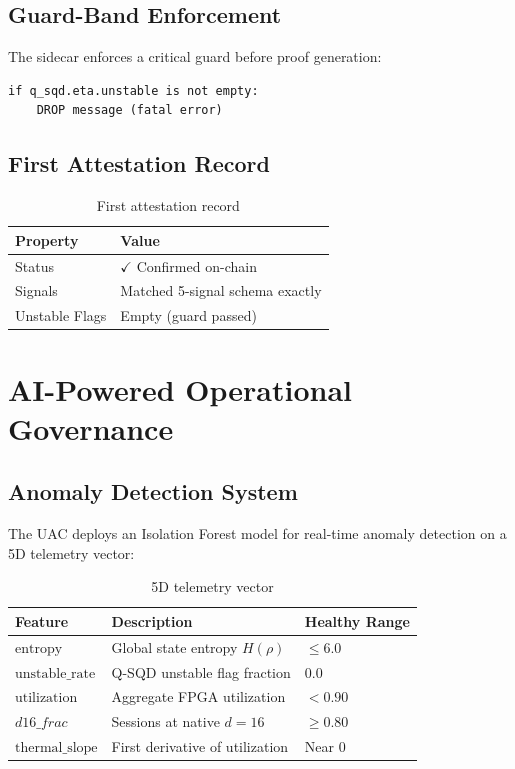\documentclass[11pt,a4paper]{article}
\theoremstyle{plain}
\begin{document}
\subsection{Guard-Band Enforcement}

The sidecar enforces a critical guard before proof generation:

\begin{lstlisting}[caption=Unstable Guard Check, label=lst:guard]
if q_sqd.eta.unstable is not empty:
    DROP message (fatal error)
\end{lstlisting}

\subsection{First Attestation Record}

\begin{table}[h]
\centering
\begin{tabular}{ll}
\toprule
\textbf{Property} & \textbf{Value} \\
\midrule
Status & $\checkmark$ Confirmed on-chain \\
Signals & Matched 5-signal schema exactly \\
Unstable Flags & Empty (guard passed) \\
\bottomrule
\end{tabular}
\caption{First attestation record}
\label{tab:firstAttestation}
\end{table}

\section{AI-Powered Operational Governance}

\subsection{Anomaly Detection System}

The UAC deploys an Isolation Forest model \cite{isolationForest, qadFramework, mlBlockchainGovernance} for real-time anomaly detection on a 5D telemetry vector:

\begin{table}[h]
\centering
\begin{tabular}{lll}
\toprule
\textbf{Feature} & \textbf{Description} & \textbf{Healthy Range} \\
\midrule
$\text{entropy}$ & Global state entropy $H(\rho)$ & $\leq 6.0$ \\
$\text{unstable\_rate}$ & Q-SQD unstable flag fraction & $0.0$ \\
$\text{utilization}$ & Aggregate FPGA utilization & $< 0.90$ \\
$d16\_frac$ & Sessions at native $d=16$ & $\geq 0.80$ \\
$\text{thermal\_slope}$ & First derivative of utilization & Near 0 \\
\bottomrule
\end{tabular}
\caption{5D telemetry vector}
\label{tab:telemetry}
\end{table}
\end{document}
